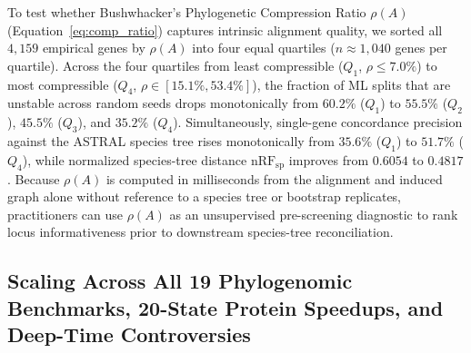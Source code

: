 \documentclass[11pt,a4paper]{article}
\begin{document}
To test whether Bushwhacker's Phylogenetic Compression Ratio $\rho(A)$ (Equation~\eqref{eq:comp_ratio}) captures intrinsic alignment quality, we sorted all $4,159$ empirical genes by $\rho(A)$ into four equal quartiles ($n \approx 1,040$ genes per quartile). Across the four quartiles from least compressible ($Q_1$, $\rho \le 7.0\%$) to most compressible ($Q_4$, $\rho \in [15.1\%, 53.4\%]$), the fraction of ML splits that are unstable across random seeds drops monotonically from $60.2\%$ ($Q_1$) to $55.5\%$ ($Q_2$), $45.5\%$ ($Q_3$), and $35.2\%$ ($Q_4$). Simultaneously, single-gene concordance precision against the ASTRAL species tree rises monotonically from $35.6\%$ ($Q_1$) to $51.7\%$ ($Q_4$), while normalized species-tree distance $\text{nRF}_{\text{sp}}$ improves from $0.6054$ to $0.4817$. Because $\rho(A)$ is computed in milliseconds from the alignment and induced graph alone without reference to a species tree or bootstrap replicates, practitioners can use $\rho(A)$ as an unsupervised pre-screening diagnostic to rank locus informativeness prior to downstream species-tree reconciliation.

\subsection{Scaling Across All 19 Phylogenomic Benchmarks, 20-State Protein Speedups, and Deep-Time Controversies}
\end{document}
